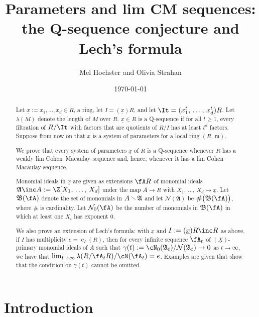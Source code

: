 \documentclass[12pt]{amsart}
\title{Parameters and lim CM sequences:\\ the Q-sequence conjecture and\\ Lech's formula}
\author{Mel Hochster and Olivia Strahan}
\date{\today}
\theoremstyle{plain}
\theoremstyle{remark}
\theoremstyle{definition}
\numberwithin{equation}{theorem}
\renewcommand{\geq}{\geqslant} \renewcommand{\leq}{\leqslant}
\begin{document}
\begin{abstract} Let $\underline{x}:=x_1,\ldots,x_d \in R$, a ring,
 let $I=(\underline{x})R$, and let $\It=(x_1^t,\,\ldots,\,x_d^t)R$. Let
$\lambda(M)$ denote the length of $M$ over $R$.  $\underline{x} \in R$ is a Q-sequence  
if for all $t \geq 1$, every filtration of $R/\It$ with factors that are quotients of $R/I$ has at 
least $t^d$ factors. Suppose from now on that $\underline{x}$ is a system of parameters for
a local ring $(R,\, \mathfrak m)$.

We prove that every system of parameters $\underline{x}$ of $R$ is a Q-sequence whenever 
$R$ has a weakly lim Cohen--Macaulay sequence and, hence, whenever it has a 
lim Cohen--Macaulay sequence.

Monomial ideals in  $\underline{x}$ are given as
extensions $\fA R$ of monomial ideals $\mathfrak{A} \inc A := \Z[X_1,\, \ldots, \, X_d]$ 
under the map $A \to R$ with $X_1, \, \ldots, \, X_d\mapsto \underline{x}$. 
Let ${\mathfrak B}(\fA)$  denote the set of monomials in 
$A \,\mbox{\raisebox{1.2pt}{$\smallsetminus$}}\, \mathfrak A$ and 
let $\mathcal{N}(\mathfrak{A})$
be  $\#\big({\mathfrak B}({\fA})\big)$, where 
$\#$ is cardinality. Let  $\mathcal{N}_0(\fA)$ be the number of monomials 
in ${\mathfrak B}({\fA})$ in which at least one $X_i$ has exponent 0.

We also prove an extension of Lech's formula: 
with $\underline{x}$ and $I := (\underline x)R \inc  R$ 
as above, if $I$ has multiplicity $e= \operatorname{e}_I(R)$, 
then for every  infinite sequence ${\fA}_t$  of 
$(\underline{X})$-primary  monomial ideals of $A$ such that 
$\gamma(t) := \cN_0({\mathfrak{A}}_t)/\mathcal{N}({\mathfrak{A}}_t) \to 0$ as 
$t \to \infty$, we have that  
$\lim_{t \to \infty} \lambda(R/{\fA}_tR)/\cN({\fA}_t) = e$. 
Examples are given that show that the condition on $\gamma(t)$ cannot be omitted.
\end{abstract}


\maketitle

\pagestyle{myheadings}  

\section{Introduction}
\end{document}
